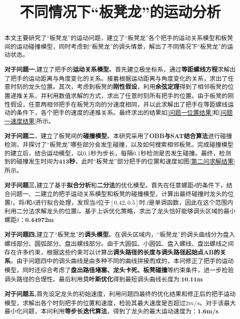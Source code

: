 \documentclass[withoutpreface,bwprint]{cumcmthesis}
\title{不同情况下“板凳龙”的运动分析}  %
\begin{document}
\maketitle
\begin{abstract}

本文主要研究了“板凳龙”的运动问题，建立了“板凳龙”各个把手的运动关系模型和板凳间的运动碰撞模型，同时考虑到“板凳龙”的调头情景，解出了不同情况下“板凳龙”的运动状态。

\textbf{对于问题一,}建立了把手的\textbf{运动关系模型}。首先建立极坐标系，通过\textbf{等距螺线方程}求解出了把手的运动距离与角度变化的关系。接着根据运动距离与角度变化的关系，求出了任意时刻的龙头位置。其次，考虑到板凳的\textbf{刚性假设}，利用\textbf{余弦定理}得到了相邻板凳的位置递推关系，并利用数值求解的方式，求出了任意时刻所有把手的位置。由于板凳的刚性假设，任意两相邻把手在板凳方向的分速度相同，并以此求解出了把手在等距螺线运动的条件下，各个把手的速度的递推关系。最终求出的结果如\cref{问题一位置结果}和\cref{问题一速度结果}所示。

\textbf{对于问题二}，建立了板凳间的\textbf{碰撞模型}。本研究采用了\textbf{OBB与SAT结合算法}进行碰撞检测，并探讨了“板凳龙”哪些部分会发生碰撞，以及如何搜索相邻板凳。完成碰撞模型的建立后，结合运动模型，以0.1秒为步长，每隔0.1秒检测是否发生碰撞。最终，检测到的碰撞发生时间为\textbf{413秒}，此时“板凳龙”部分把手的位置和速度如图\cref{第二问求解结果}所示。

\textbf{对于问题三,}建立了基于\textbf{拟合分析}和\textbf{二分法}的优化模型。首先在任意螺距$\delta$的条件下，结合问题一、二建立的把手运动关系模型和板凳的碰撞模型，计算出最终碰撞时龙头的位置$l$，将$l$和$\delta$进行拟合处理，发现当$\delta$位于$[0.42,0.5]$时,$l$是单调函数，因此在这个范围内利用二分法求解龙头的位置$l$。基于上诉优化策略，求出了龙头恰好能够调头区域的最小螺距$\delta$：\textbf{0.44972m}

\textbf{对于问题四,}建立了“板凳龙”的\textbf{调头模型}。在调头区域内，“板凳龙”的调头曲线分为盘入螺线部分、圆弧部分、盘出螺线部分。由于大圆弧、小圆弧、盘入螺线、盘出螺线之间存在许多约束，根据这些约束可以计算出\textbf{调头路径的长度与调头路径起始点AB的关系}。由于问题四中的调头曲线是由多种不同的曲线拼接而成的，本问修正了把手的运动模型，同时还综合考虑了\textbf{盘出路径堵塞、龙头卡死、板凳碰撞}等约束条件，进一步检验调头路径的合理性。最后利用\textbf{贝叶斯优化}得到最短调头曲线长度为:\textbf{10.11m}

\textbf{对于问题五,}首先设定龙头的初始速度，利用问题四最终的优化结果和修正后的把手运动模型，求解出各个时刻把手的位置和速度，检验其最大速度是否超过$2m/s$。对于该最大最小化问题，本问利用\textbf{等步长迭代算法}，得到了龙头的最大运动速度为：\textbf{1.6m/s}



\end{abstract}
\end{document}
